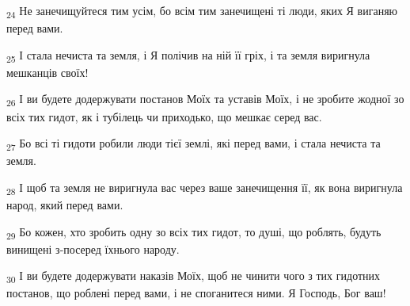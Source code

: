 \begin{tcolorbox}
\textsubscript{24} Не занечищуйтеся тим усім, бо всім тим занечищені ті люди, яких Я виганяю перед вами.
\end{tcolorbox}
\begin{tcolorbox}
\textsubscript{25} І стала нечиста та земля, і Я полічив на ній її гріх, і та земля виригнула мешканців своїх!
\end{tcolorbox}
\begin{tcolorbox}
\textsubscript{26} І ви будете додержувати постанов Моїх та уставів Моїх, і не зробите жодної зо всіх тих гидот, як і тубілець чи приходько, що мешкає серед вас.
\end{tcolorbox}
\begin{tcolorbox}
\textsubscript{27} Бо всі ті гидоти робили люди тієї землі, які перед вами, і стала нечиста та земля.
\end{tcolorbox}
\begin{tcolorbox}
\textsubscript{28} І щоб та земля не виригнула вас через ваше занечищення її, як вона виригнула народ, який перед вами.
\end{tcolorbox}
\begin{tcolorbox}
\textsubscript{29} Бо кожен, хто зробить одну зо всіх тих гидот, то душі, що роблять, будуть винищені з-посеред їхнього народу.
\end{tcolorbox}
\begin{tcolorbox}
\textsubscript{30} І ви будете додержувати наказів Моїх, щоб не чинити чого з тих гидотних постанов, що роблені перед вами, і не споганитеся ними. Я Господь, Бог ваш!
\end{tcolorbox}
